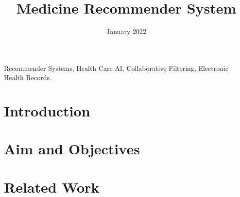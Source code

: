 \documentclass[conference]{IEEEtran}
\begin{document}
\title{Medicine Recommender System}

\author{
	\date{January 2022}
}

\maketitle

\begin{abstract}
    
\end{abstract}

\begin{IEEEkeywords}
    Recommender Systems, Health Care AI, Collaborative Filtering,
    Electronic Health Records.
\end{IEEEkeywords}

\section{Introduction}
    

\section{Aim and Objectives}
    


\section{Related Work}
    

    

\end{document}
